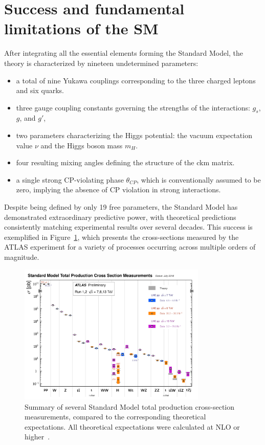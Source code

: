 \section{Success and fundamental limitations of the SM}
\label{sec:BSM}
After integrating all the essential elements forming the Standard Model, the theory is characterized by nineteen undetermined parameters:
\begin{itemize}
  \item a total of nine Yukawa couplings corresponding to the three charged leptons and six quarks.
  \item three gauge coupling constants governing the strengths of the interactions: \( g_s \), \( g \), and \( g' \),
  \item two parameters characterizing the Higgs potential: the vacuum expectation value \(\nu\) and the Higgs boson mass \(m_H\).
  \item four resulting mixing angles defining the structure of the \acrshort{ckm} matrix.
  \item a single strong CP-violating phase \(\theta_{CP}\), which is conventionally assumed to be zero, implying the absence of CP violation in strong interactions.
\end{itemize}
Despite being defined by only 19 free parameters, the Standard Model has demonstrated extraordinary predictive power, with theoretical predictions consistently matching experimental results over several decades. This success is exemplified in Figure~\ref{fig:totalxsect}, which presents the cross-sections measured by the ATLAS experiment for a variety of processes occurring across multiple orders of magnitude.
\begin{figure}[htbp]
  \centering
  \includegraphics[width=0.8\textwidth]{images/totalxsect.pdf}
  \caption{Summary of several Standard Model total production cross-section measurements, compared to the corresponding theoretical expectations. All theoretical expectations were calculated at NLO or higher~\cite{PlotsXsect}.}
  \label{fig:totalxsect}
\end{figure}

